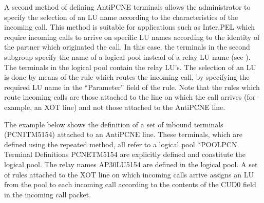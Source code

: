 \documentclass[letterpaper,10pt,english]{sphinxmanual}
\begin{document}
\sphinxAtStartPar
{}

\sphinxAtStartPar
A second method of defining AntiPCNE terminals allows the administrator to specify the selection of an LU name according to the characteristics of the incoming call. This method is suitable for applications such as Inter.PEL which require incoming calls to arrive on specific LU names according to the identity of the partner which originated the call. In this case, the terminals in the second sub\sphinxhyphen{}group specify the name of a logical pool instead of a relay LU name (see {\hyperref[\detokenize{connectivity_guide:v462cn-logicalpool}]{}}). The terminals in the logical pool contain the relay LU’s. The selection of an LU is done by means of the rule which routes the incoming call, by specifying the required LU name in the “Parameter” field of the rule. Note that the rules which route incoming calls are those attached to the line on which the call arrives (for example, an XOT line) and not those attached to the AntiPCNE line.

\sphinxAtStartPar
The example below shows the definition of a set of inbound terminals (PCN1TM51\sphinxhyphen{}54) attached to an AntiPCNE line. These terminals, which are defined using the repeated method, all refer to a logical pool *POOLPCN. Terminal Definitions PCNETM51\sphinxhyphen{}54 are explicitly defined and constitute the logical pool. The relay names AP30LU51\sphinxhyphen{}54 are defined in the logical pool. A set of rules attached to the XOT line on which incoming calls arrive assigns an LU from the pool to each incoming call according to the contents of the CUD0 field in the incoming call packet.
\end{document}
